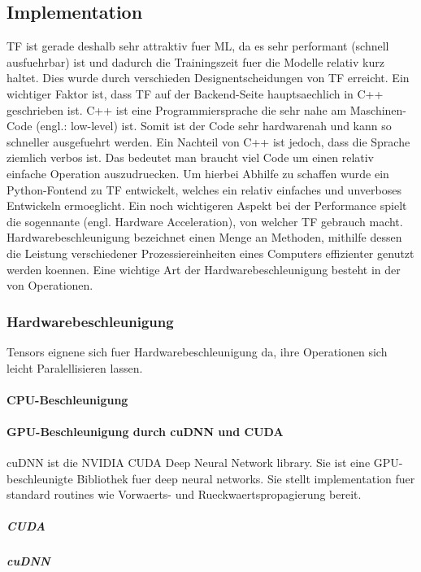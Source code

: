 \subsection{Implementation}
TF ist gerade deshalb sehr attraktiv fuer ML, da es sehr performant (schnell
ausfuehrbar) ist und dadurch die Trainingszeit fuer die Modelle relativ
kurz haltet. Dies wurde durch verschieden Designentscheidungen von TF erreicht.
\para{}
Ein wichtiger Faktor ist, dass TF auf der Backend-Seite hauptsaechlich in C++
geschrieben ist. C++ ist eine Programmiersprache die sehr nahe am Maschinen-Code
(engl.: low-level) ist. Somit ist der Code sehr hardwarenah und kann so
schneller ausgefuehrt werden. Ein Nachteil von C++ ist jedoch, dass die Sprache
ziemlich verbos ist. Das bedeutet man braucht viel Code um einen relativ
einfache Operation auszudruecken. Um hierbei Abhilfe zu schaffen wurde ein
Python-Fontend zu TF entwickelt, welches ein relativ einfaches und unverboses
Entwickeln ermoeglicht.
\para{}
Ein noch wichtigeren Aspekt bei der Performance spielt die sogennante
 (engl. Hardware Acceleration), von welcher TF
gebrauch macht. Hardwarebeschleunigung bezeichnet einen Menge an Methoden,
mithilfe dessen die Leistung verschiedener Prozessiereinheiten eines Computers
effizienter genutzt werden koennen. Eine wichtige Art der Hardwarebeschleunigung
besteht in der  von Operationen.

\subsubsection{Hardwarebeschleunigung}
Tensors eignene sich fuer Hardwarebeschleunigung da, ihre Operationen sich
leicht Paralellisieren lassen.

\paragraph{CPU-Beschleunigung}


\paragraph{GPU-Beschleunigung durch cuDNN und CUDA}
cuDNN ist die NVIDIA CUDA Deep Neural Network library. Sie ist eine
GPU-beschleunigte Bibliothek fuer deep neural networks. Sie stellt
implementation fuer standard routines wie Vorwaerts- und Rueckwaertspropagierung bereit.

\subparagraph{CUDA}
\subparagraph{cuDNN}

